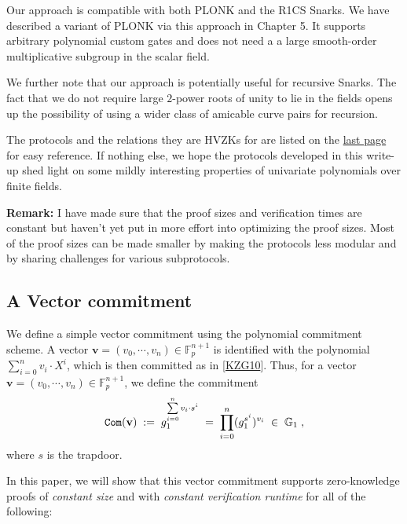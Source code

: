 \documentclass[11pt, lettersize, notitlepage, leqno, footskip=0.6cm]{article}
\newcommand{\bFp}{\mathbb{F}_p}
\newcommand{\mb}{\mathbb}
\newcommand{\mbf}{\mathbf}
\newcommand{\vs}{\vspace{-0.15cm}}
\newcommand{\noin}{\noindent}
\numberwithin{equation}{section}
\begin{document}
Our approach is compatible with both PLONK and the R1CS Snarks. We have described a variant of PLONK via this approach in Chapter 5. It supports arbitrary polynomial custom gates and does not need a a large smooth-order multiplicative subgroup in the scalar field. 

We further note that our approach is potentially useful for recursive Snarks. The fact that we do not require large $2$-power roots of unity to lie in the fields opens up the possibility of using a wider class of amicable curve pairs for recursion.


The protocols and the relations they are HVZKs for are listed on the \hyperlink{Protocol List}{last page} for easy reference. If nothing else, we hope the protocols developed in this write-up shed light on some mildly interesting properties of univariate polynomials over finite fields.



\bigskip

\noin \textbf{Remark:} I have made sure that the proof sizes and verification times are constant but haven't yet put in more effort into optimizing the proof sizes. Most of the proof sizes can be made smaller by making the protocols less modular and by sharing challenges for various subprotocols. 
 







\subsection{\fontsize{11}{11}\selectfont A Vector commitment}

We define a simple vector commitment using the polynomial commitment scheme. A vector $\mbf{v}= (v_0,\cdots,v_n)\in \bFp^{n+1}$ is identified with the polynomial $\sum\limits_{i=0}^{n} v_i\cdot X^i$, which is then committed as in [\hyperlink{KZG}{\hyperlink{KZG}{\hyperlink{KZG}{KZG10}}}]. Thus, for a vector $\mbf{v}= (v_0,\cdots,v_n)\in \bFp^{n+1}$, we define the commitment \vs $$ {\tt{Com}}(\mbf{v}) \;:=\; g_1^{\sum\limits_{i=0}^{n} v_i\cdot s^i} \;=\; \prod\limits_{i=0}^n (g_1^{s^i})^{v_i}\;\in\; \mb{G}_1\;,  \vs $$ where $s$ is the trapdoor. \vspace{2mm}

In this paper, we will show that this vector commitment supports zero-knowledge proofs of \textit{constant size} and with \textit{constant verification runtime} for all of the following: \vspace{2mm}
\end{document}
